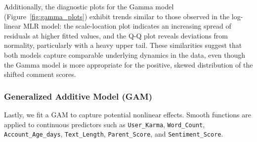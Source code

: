 \documentclass[10pt]{article}
\begin{document}
\noindent Additionally, the diagnostic plots for the Gamma model (Figure~\ref{fig:gamma_plots}) exhibit trends similar to those observed in the log-linear MLR model: the scale-location plot indicates an increasing spread of residuals at higher fitted values, and the Q-Q plot reveals deviations from normality, particularly with a heavy upper tail. These similarities suggest that both models capture comparable underlying dynamics in the data, even though the Gamma model is more appropriate for the positive, skewed distribution of the shifted comment scores.

\subsubsection{Generalized Additive Model (GAM)}
Lastly, we fit a GAM to capture potential nonlinear effects. Smooth functions are applied to continuous predictors such as \texttt{User\_Karma}, \texttt{Word\_Count}, \texttt{Account\_Age\_days}, \texttt{Text\_Length}, \texttt{Parent\_Score}, and \texttt{Sentiment\_Score}.
\end{document}
